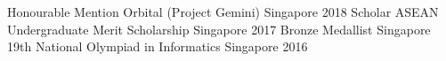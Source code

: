 



\begin{cvhonors}  
  \cvhonor
	{Honourable Mention} %
	{Orbital (Project Gemini)} %
	{Singapore} %
	{2018} %
  \cvhonor
	{Scholar} %
	{ASEAN Undergraduate Merit Scholarship} %
	{Singapore} %
	{2017} %
  \cvhonor
    {Bronze Medallist} %
    {Singapore 19th National Olympiad in Informatics} %
    {Singapore} %
    {2016} %
    
    
 

\end{cvhonors}
